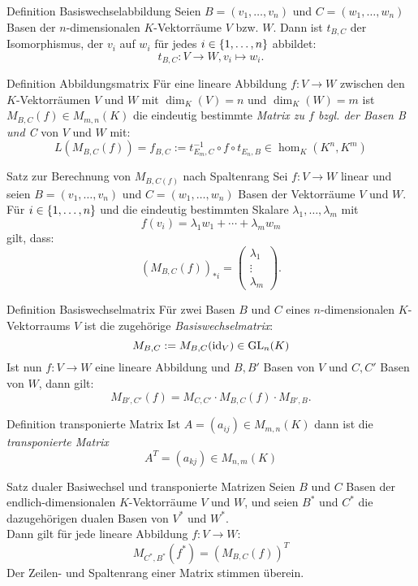 \documentclass[main.tex]{subfiles}
\begin{document}
\begin{karte}{Definition Basiswechselabbildung}
    Seien \(B = (v_1, \ldots , v_n)\) und \(C = (w_1, \ldots , w_n)\)
    Basen der \(n\)-dimensionalen \(K\)-Vektorräume \(V\) bzw. \(W\).
    Dann ist \(t_{B,C}\) der Isomorphismus, der \(v_i\) auf \(w_i\) für 
    jedes \(i \in \{1, \ldots,n\}\) abbildet: 
    \[ t_{B,C}: V \rightarrow W, v_i \mapsto w_i. \]
\end{karte}
\begin{karte}{Definition Abbildungsmatrix}
    Für eine lineare Abbildung \(f:V \rightarrow W\) zwischen den
    \(K\)-Vektorräumen \(V\) und \(W\) mit \(\dim_K(V) = n\) und 
    \(\dim_K(W) = m\) ist \(M_{B,C}(f) \in M_{m,n}(K)\) die 
    eindeutig bestimmte \textit{Matrix zu \(f\) bzgl. der Basen 
    B und C} von \(V\) und \(W\) mit: 
    \[ L(M_{B,C}(f)) = f_{B,C} := t_{E_m,C}^{-1} \circ f \circ t_{E_n,B} 
    \in \hom_K(K^n,K^m)\] 
\end{karte}
\begin{karte}{Satz zur Berechnung von \(M_{B,C(f)}\) nach Spaltenrang}
    Sei \(f: V \rightarrow W\) linear und seien \(B = (v_1, \ldots ,v_n)\)
    und \(C = (w_1, \ldots , w_n)\) Basen der Vektorräume \(V\) und \(W\).
    Für \(i \in \{1,\ldots,n\}\) und die eindeutig bestimmten Skalare
    \(\lambda_1,\ldots,\lambda_m\) mit
    \[f(v_i) = \lambda_1w_1 + \cdots + \lambda_m w_m\]
    gilt, dass: 
    \[{(M_{B,C}(f))}_{*i} = 
    \begin{pmatrix}
        \lambda_1 \\
        \vdots \\
        \lambda_m
    \end{pmatrix}.\]
\end{karte}
\begin{karte}{Definition Basiswechselmatrix}
    Für zwei Basen \(B\) und \(C\) eines \(n\)-dimensionalen 
    \(K\)-Vektorraums \(V\) ist die zugehörige 
    \textit{Basiswechselmatrix}:
    \[M_{B,C} := M_{B,C}(\operatorname{id}_V) \in \operatorname{GL}_n(K) \]
    Ist nun \(f: V \rightarrow W\) eine lineare Abbildung und 
    \(B,B'\) Basen von \(V\) und \(C,C'\) Basen von \(W\), dann gilt:
    \[ M_{B',C'}(f) = M_{C,C'} \cdot M_{B,C}(f) \cdot M_{B',B}. \]
\end{karte}
\begin{karte}{Definition transponierte Matrix}
    Ist \(A = (a_{ij}) \in M_{m,n}(K)\) dann ist die \textit{transponierte Matrix}
    \[ A^T  = (a_{kj}) \in M_{n,m}(K) \]
\end{karte}
\begin{karte}{Satz dualer Basiwechsel und transponierte Matrizen}
    Seien \(B\) und \(C\) Basen der endlich-dimensionalen 
    \(K\)-Vektorräume \(V\) und \(W\), und seien \(B^*\) und \(C^*\)
    die dazugehörigen dualen Basen von \(V^*\) und \(W^*\).\\
    Dann gilt für jede lineare Abbildung \(f: V \rightarrow W\):
    \[M_{C^*,B^*}(f^*) = {(M_{B,C}(f))}^T\]
    Der Zeilen- und Spaltenrang einer Matrix stimmen überein.
\end{karte}
\end{document}
